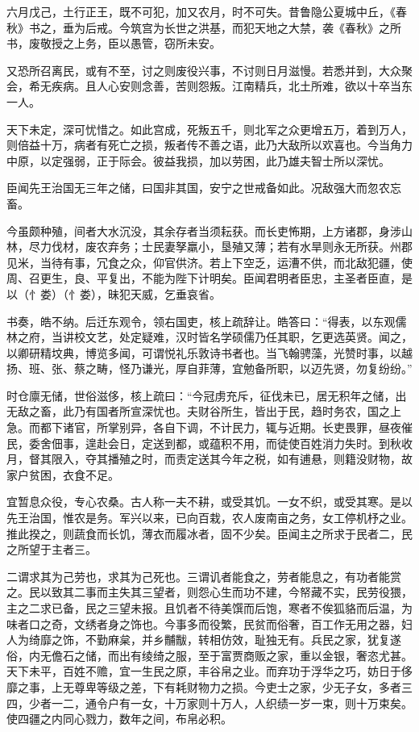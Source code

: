 \documentclass[12pt,UTF8]{ctexbook}
\begin{document}
六月戊己，土行正王，既不可犯，加又农月，时不可失。昔鲁隐公夏城中丘，《春秋》书之，垂为后戒。今筑宫为长世之洪基，而犯天地之大禁，袭《春秋》之所书，废敬授之上务，臣以愚管，窃所未安。

又恐所召离民，或有不至，讨之则废役兴事，不讨则日月滋慢。若悉并到，大众聚会，希无疾病。且人心安则念善，苦则怨叛。江南精兵，北土所难，欲以十卒当东一人。

天下未定，深可忧惜之。如此宫成，死叛五千，则北军之众更增五万，着到万人，则倍益十万，病者有死亡之损，叛者传不善之语，此乃大敌所以欢喜也。今当角力中原，以定强弱，正于际会。彼益我损，加以劳困，此乃雄夫智士所以深忧。

臣闻先王治国无三年之储，曰国非其国，安宁之世戒备如此。况敌强大而忽农忘畜。

今虽颇种殖，间者大水沉没，其余存者当须耘获。而长吏怖期，上方诸郡，身涉山林，尽力伐材，废农弃务；士民妻孥羸小，垦殖又薄；若有水旱则永无所获。州郡见米，当待有事，冗食之众，仰官供济。若上下空乏，运漕不供，而北敌犯疆，使周、召更生，良、平复出，不能为陛下计明矣。臣闻君明者臣忠，主圣者臣直，是以（忄娄）（忄娄），昧犯天威，乞垂哀省。

书奏，皓不纳。后迁东观令，领右国吏，核上疏辞让。皓答曰：“得表，以东观儒林之府，当讲校文艺，处定疑难，汉时皆名学硕儒乃任其职，乞更选英贤。闻之，以卿研精坟典，博览多闻，可谓悦礼乐敦诗书者也。当飞翰骋藻，光赞时事，以越扬、班、张、蔡之畴，怪乃谦光，厚自菲薄，宜勉备所职，以迈先贤，勿复纷纷。”

时仓廪无储，世俗滋侈，核上疏曰：“今冠虏充斥，征伐未已，居无积年之储，出无敌之畜，此乃有国者所宣深忧也。夫财谷所生，皆出于民，趋时务农，国之上急。而都下诸官，所掌别异，各自下调，不计民力，辄与近期。长吏畏罪，昼夜催民，委舍佃事，遑赴会日，定送到都，或蕴积不用，而徒使百姓消力失时。到秋收月，督其限入，夺其播殖之时，而责定送其今年之税，如有逋悬，则籍没财物，故家户贫困，衣食不足。

宜暂息众役，专心农桑。古人称一夫不耕，或受其饥。一女不织，或受其寒。是以先王治国，惟农是务。军兴以来，已向百栽，农人废南亩之务，女工停机杼之业。推此揆之，则蔬食而长饥，薄衣而履冰者，固不少矣。臣闻主之所求于民者二，民之所望于主者三。

二谓求其为己劳也，求其为己死也。三谓讥者能食之，劳者能息之，有功者能赏之。民以致其二事而主失其三望者，则怨心生而功不建，今帑藏不实，民劳役猥，主之二求已备，民之三望未报。且饥者不待美馔而后饱，寒者不俟狐貉而后温，为味者口之奇，文绣者身之饰也。今事多而役繁，民贫而俗奢，百工作无用之器，妇人为绮靡之饰，不勤麻枲，并乡黼黻，转相仿效，耻独无有。兵民之家，犹复遂俗，内无儋石之储，而出有绫绮之服，至于富贾商贩之家，重以金银，奢恣尤甚。天下未平，百姓不赡，宜一生民之原，丰谷帛之业。而弃功于浮华之巧，妨日于侈靡之事，上无尊卑等级之差，下有耗财物力之损。今吏士之家，少无子女，多者三四，少者一二，通令户有一女，十万家则十万人，人织绩一岁一束，则十万束矣。使四疆之内同心戮力，数年之间，布帛必积。
\end{document}
